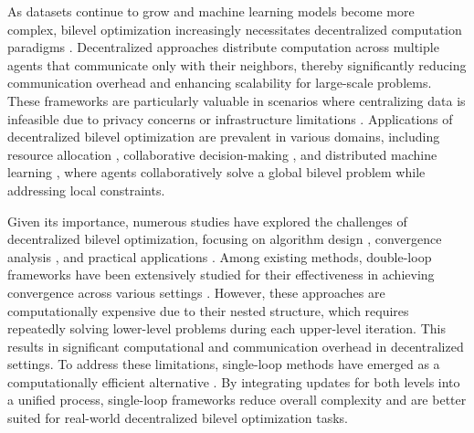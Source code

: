\documentclass{article}
\theoremstyle{plain}
\theoremstyle{definition}
\theoremstyle{remark}
\begin{document}
As datasets continue to grow and machine learning models become more complex, bilevel optimization increasingly necessitates decentralized computation paradigms \citep{kong2024decentralized}. Decentralized approaches distribute computation across multiple agents that communicate only with their neighbors, thereby significantly reducing communication overhead and enhancing scalability for large-scale problems. These frameworks are particularly valuable in scenarios where centralizing data is infeasible due to privacy concerns or infrastructure limitations \citep{zhang2019metapred, kayaalp2022dif}. Applications of decentralized bilevel optimization are prevalent in various domains, including resource allocation \citep{ji2023network}, collaborative decision-making \citep{hashemi2024cobo}, and distributed machine learning \citep{jiao2022asynchronous}, where agents collaboratively solve a global bilevel problem while addressing local constraints.

Given its importance, numerous studies have explored the challenges of decentralized bilevel optimization, focusing on algorithm design \citep{lu2022stochastic}, convergence analysis \citep{wang2024fully}, and practical applications \citep{lu2022decentralized,liu2022interact}. Among existing methods, double-loop frameworks have been extensively studied for their effectiveness in achieving convergence across various settings \citep{chen2024decentralized, chen2023decentralized}. However, these approaches are computationally expensive due to their nested structure, which requires repeatedly solving lower-level problems during each upper-level iteration. This results in significant computational and communication overhead in decentralized settings. To address these limitations, single-loop methods have emerged as a computationally efficient alternative \citep{zhu2024sparkle, dong2023single}. By integrating updates for both levels into a unified process, single-loop frameworks reduce overall complexity and are better suited for real-world decentralized bilevel optimization tasks.
\end{document}
